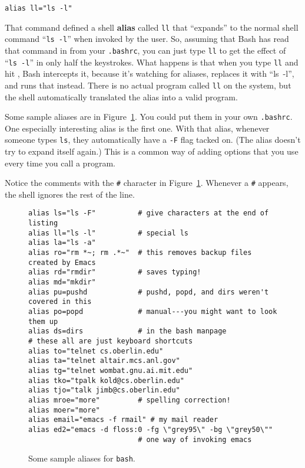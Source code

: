 \begin{screen}\begin{verbatim}
alias ll="ls -l"
\end{verbatim}\end{screen}

That command defined a shell {\bf alias} called
{\tt ll} that ``expands'' to the normal shell command ``{\tt ls~-l}''
when invoked by the user.  So, assuming that Bash has read that
command in from your {\tt .bashrc\/}, you can just type {\tt ll} to
get the effect of ``{\tt ls~-l}'' in only half the keystrokes.  What
happens is that when you type {\tt ll} and hit , Bash
intercepts it, because it's watching for aliases, replaces it with
``{ls~-l}'', and runs that instead.  There is no actual program called
{\tt ll} on the system, but the shell automatically translated the
alias into a valid program.

Some sample aliases are in Figure~\ref{sample-aliases}.  You could put
them in your own {\tt .bashrc}. One especially interesting alias is
the first one. With that alias, whenever someone types {\tt ls}, they
automatically have a {\tt -F} flag tacked on. (The alias
doesn't try to expand itself again.) This is a common way of adding
options that you use every time you call a program.

Notice the comments with the {\tt \#} character in
Figure~\ref{sample-aliases}. Whenever a {\tt \#} appears, the shell
ignores the rest of the line.

\begin{figure}\label{sample-aliases}
\begin{screen}\begin{verbatim}
alias ls="ls -F"          # give characters at the end of listing
alias ll="ls -l"          # special ls
alias la="ls -a"
alias ro="rm *~; rm .*~"  # this removes backup files created by Emacs
alias rd="rmdir"          # saves typing!
alias md="mkdir"
alias pu=pushd            # pushd, popd, and dirs weren't covered in this
alias po=popd             # manual---you might want to look them up
alias ds=dirs             # in the bash manpage
# these all are just keyboard shortcuts
alias to="telnet cs.oberlin.edu"
alias ta="telnet altair.mcs.anl.gov"
alias tg="telnet wombat.gnu.ai.mit.edu"
alias tko="tpalk kold@cs.oberlin.edu"
alias tjo="talk jimb@cs.oberlin.edu"
alias mroe="more"         # spelling correction!
alias moer="more"
alias email="emacs -f rmail" # my mail reader
alias ed2="emacs -d floss:0 -fg \"grey95\" -bg \"grey50\""
                          # one way of invoking emacs
\end{verbatim}\end{screen}
\caption{Some sample aliases for {\tt bash}.}
\end{figure}        

